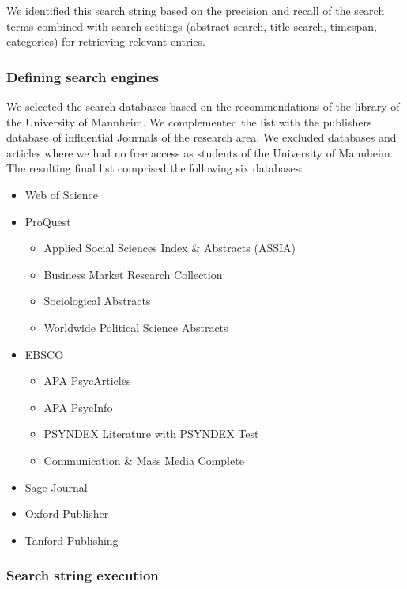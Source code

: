 We identified this search string based on the precision and recall of the search terms combined with search settings (abstract search, title search, timespan, categories) for retrieving relevant entries. 


\subsubsection{Defining search engines}
\label{subsubsec: Defining search engines}

We selected the search databases based on the recommendations of the library of the University of Mannheim. We complemented the list with the publishers database of influential Journals of the research area. We excluded databases and articles where we had no free access as students of the University of Mannheim. The resulting final list comprised the following six databases:

\begin{itemize}
    \item  Web of Science
    \item ProQuest
    \begin{itemize}
        \item Applied Social Sciences Index \& Abstracts (ASSIA)
        \item Business Market Research Collection
        \item Sociological Abstracts
        \item Worldwide Political Science Abstracts
    \end{itemize}
    \item EBSCO
    \begin{itemize}
        \item APA PsycArticles
        \item APA PsycInfo
        \item PSYNDEX Literature with PSYNDEX Test
        \item Communication \& Mass Media Complete
    \end{itemize}
    \item Sage Journal
    \item Oxford Publisher
    \item Tanford Publishing
\end{itemize}

\subsubsection{Search string execution}

